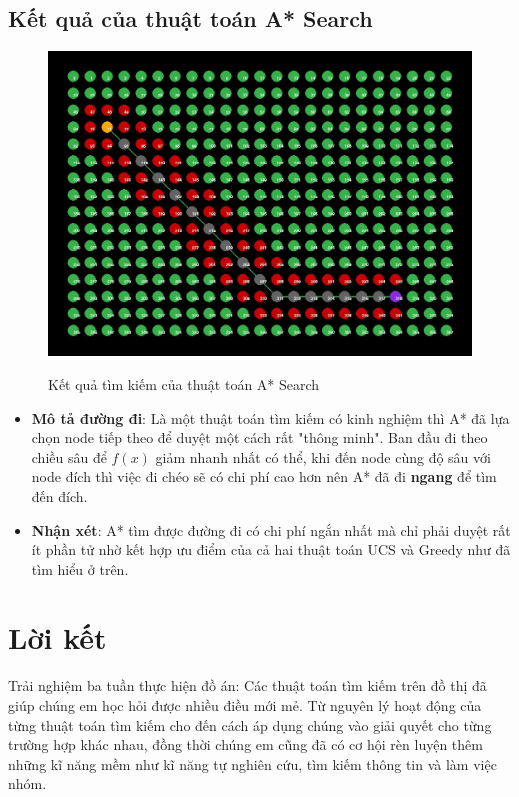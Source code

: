 \section{Kết quả của thuật toán A* Search}
\begin{figure}[H]
    \centering
    \includegraphics[scale=0.4]{pic/AStar.jpg}
    \label{fig:my_label}
    \caption{Kết quả tìm kiếm của thuật toán A* Search}
\end{figure}
\begin{itemize}
    \item \textbf{Mô tả đường đi}: Là một thuật toán tìm kiếm có kinh nghiệm thì A* đã lựa chọn node tiếp theo để duyệt một cách rất "thông minh". Ban đầu đi theo chiều sâu để $f(x)$ giảm nhanh nhất có thể, khi đến node cùng độ sâu với node đích thì việc đi chéo sẽ có chi phí cao hơn nên A* đã đi \textbf{ngang} để tìm đến đích.
    \item \textbf{Nhận xét}: A* tìm được đường đi có chi phí ngắn nhất mà chỉ phải duyệt rất ít phần tử nhờ kết hợp ưu điểm của cả hai thuật toán UCS và Greedy như đã tìm hiểu ở trên. 
\end{itemize}

\chapter*{\centering Lời kết}

 
\hspace{0.42cm}
Trải nghiệm ba tuần thực hiện đồ án: Các thuật toán tìm kiếm trên đồ thị đã giúp chúng em học hỏi được nhiều điều mới mẻ. Từ nguyên lý hoạt động của từng thuật toán tìm kiếm cho đến cách áp dụng chúng vào giải quyết cho từng trường hợp khác nhau, đồng thời chúng em cũng đã có cơ hội rèn luyện thêm những kĩ năng mềm như kĩ năng tự nghiên cứu, tìm kiếm thông tin và làm việc nhóm.\\


